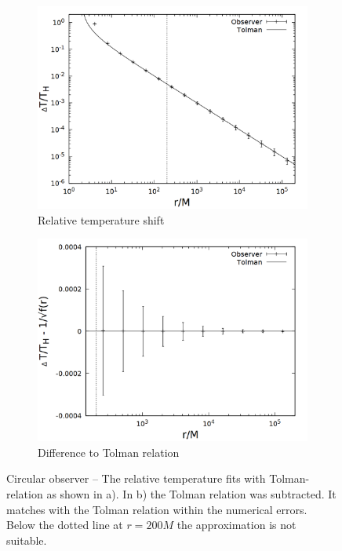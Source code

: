 \begin{figure}[h]
  \centering
  \begin{subfigure}[h]{0.5\textwidth}
    \centering
    \includegraphics[width=\textwidth]{cpp/final/circ.png}
    \caption{Relative temperature shift}
  \end{subfigure}%
  \begin{subfigure}[h]{0.5\textwidth}
    \centering
    \includegraphics[width=\textwidth]{cpp/final/circ_tolman.png}
    \caption{Difference to Tolman relation}
  \end{subfigure}
  \caption[Circular observer]{Circular observer -- The relative temperature fits with Tolman-relation as shown in a). In b) the Tolman relation was subtracted. It matches with the Tolman relation within the numerical errors. Below the dotted line at \(r = 200M\) the approximation is not suitable.}
  \label{fig:bh_circ}
\end{figure} 

